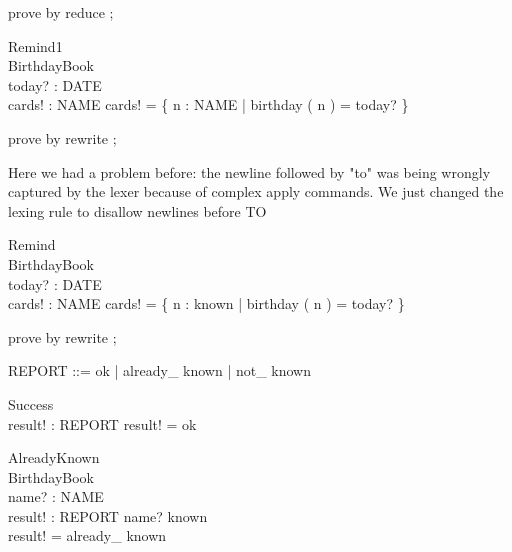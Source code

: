 \begin{zproof}[AddFind]

 prove by reduce ;
 

\end{zproof}



\begin{schema}{Remind1}
\\
 \Xi BirthdayBook \\
 today? : DATE \\
 cards! : \power NAME 
\where
 cards! = \{ n : NAME | birthday ( n ) = today? \}
\end{schema}



\begin{zproof}

 prove by rewrite ;
 

\end{zproof}



Here we had a problem before: the newline followed by "to" was being wrongly
captured by the lexer because of complex apply commands. We just changed the
lexing rule to disallow newlines before TO
\begin{schema}{Remind}
\\
 \Xi BirthdayBook \\
 today? : DATE \\
 cards! : \power NAME 
\where
 cards! = \{ n : known | birthday ( n ) = today? \}
\end{schema}



\begin{zproof}

 prove by rewrite ;
 

\end{zproof}



\begin{zed}REPORT ::= ok | already\_ known | not\_ known
\end{zed}



\begin{schema}{Success}
\\
 result! : REPORT 
\where
 result! = ok
\end{schema}



\begin{schema}{AlreadyKnown}
\\
 \Xi BirthdayBook \\
 name? : NAME \\
 result! : REPORT 
\where
 name? \in known \\
 result! = already\_ known
\end{schema}



